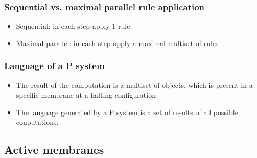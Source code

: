 


    \begin{frame}[t]\frametitle{Sequential vs. maximal parallel rule application}
      \begin{itemize}
        \item Sequential: in each step apply 1 rule
        \item Maximal parallel: in each step apply a maximal multiset of rules
      \end{itemize}
      \simulationpicture
    \end{frame}
    \note{}

    \begin{frame}[t]\frametitle{Language of a P system}
      \begin{itemize}
        \item The result of the computation is a multiset of objects, which is present in a specific membrane at a halting configuration
        \item The language generated by a P system is a set of results of all possible conputations.
      \end{itemize}
    \end{frame}
    \note{}
    \newpage
    \note{}


  \subsection{Active membranes} %
  \label{sub:active_membranes}

